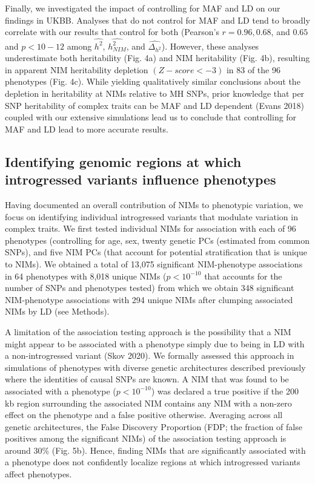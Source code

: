 Finally, we investigated the impact of controlling for MAF and LD on our findings in UKBB. Analyses that do not control for MAF and LD tend to broadly correlate with our results that control for both (Pearson’s $r = 0.96, 0.68$, and $0.65$ and $p < 10-12$ among $\hat{h^2}$, $\hat{h^2_{NIM}}$, and $\hat{\Delta_{h^2}}$). However, these analyses underestimate both heritability (Fig. 4a) and NIM heritability (Fig. 4b), resulting in apparent NIM heritability depletion $(Z-score < -3)$ in 83 of the 96 phenotypes (Fig. 4c). While yielding qualitatively similar conclusions about the depletion in heritability at NIMs relative to MH SNPs, prior knowledge that per SNP heritability of complex traits can be MAF and LD dependent (Evans 2018) coupled with our extensive simulations lead us to conclude that controlling for MAF and LD lead to more accurate results. 

\subsection{Identifying genomic regions at which introgressed variants influence phenotypes}
Having documented an overall contribution of NIMs to phenotypic variation, we focus on identifying individual introgressed variants that modulate variation in complex traits. We first tested individual NIMs for association with each of 96 phenotypes (controlling for age, sex, twenty genetic PCs (estimated from common SNPs), and five NIM PCs (that account for potential stratification that is unique to NIMs). We obtained a total of 13,075 significant NIM-phenotype associations in 64 phenotypes with 8,018 unique NIMs ($p < 10^{-10}$ that accounts for the number of SNPs and phenotypes tested)  from which we obtain 348 significant NIM-phenotype associations with 294 unique NIMs after clumping associated NIMs by LD (see Methods).
 
A limitation of the association testing approach is the possibility that a NIM might appear to be associated with a phenotype simply due to being in LD with a non-introgressed variant (Skov 2020). We formally assessed this approach in simulations of phenotypes with diverse genetic architectures described previously where the identities of causal SNPs are known. A NIM that was found to be associated with a phenotype ($p < 10^{-10}$) was declared a true positive if the 200 kb region surrounding the associated NIM contains any NIM with a non-zero effect on the phenotype and a false positive otherwise. Averaging across all genetic architectures, the False Discovery Proportion (FDP; the fraction of false positives among the significant NIMs) of the association testing approach is around 30\% (Fig. 5b). Hence, finding NIMs that are significantly associated with a phenotype does not confidently localize regions at which introgressed variants affect phenotypes.

